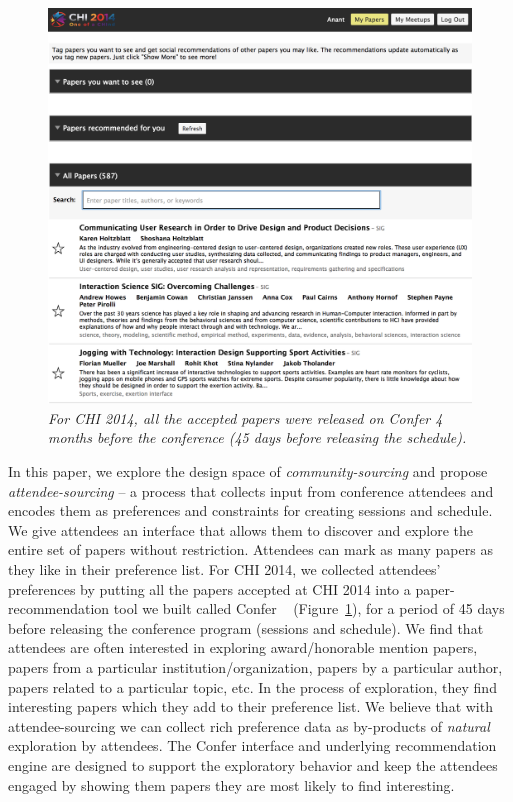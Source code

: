 \documentclass[letterpaper]{article}
\begin{document}
\begin{figure}[!h]
\centering
\includegraphics[width=0.9\columnwidth]{all-accepted-papers.png}
\caption{\emph{For CHI 2014, all the accepted papers were released on Confer 4 months before the conference (45 days before releasing the schedule).}}
\label{all-accepted-papers}
\end{figure}

In this paper, we explore the design space of \emph{community-sourcing} and propose \emph{attendee-sourcing} -- a process that collects input from conference attendees and encodes them as preferences and constraints for creating sessions and schedule. We give attendees an interface that allows them to discover and explore the entire set of papers without restriction. Attendees can mark as many papers as they like in their preference list. For CHI 2014, we collected attendees' preferences by putting all the papers accepted at CHI 2014 into a paper-recommendation tool we built called Confer ~\cite{Confer} (Figure~\ref{all-accepted-papers}), for a period of 45 days before releasing the conference program (sessions and schedule). We find that attendees are often interested in exploring award/honorable mention papers, papers from a particular institution/organization, papers by a particular author, papers related to a particular topic, etc. In the process of exploration, they find interesting papers which they add to their preference list. We believe that with attendee-sourcing we can collect rich preference data as by-products of \emph{natural} exploration by attendees. The Confer interface and underlying recommendation engine are designed to support the exploratory behavior and keep the attendees engaged by showing them papers they are most likely to find interesting.
\end{document}

